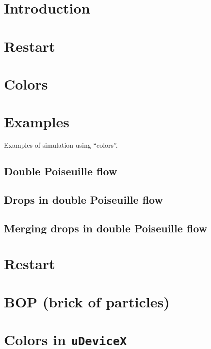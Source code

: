 \documentclass{article}
\begin{document}
\maketitle

\section{Introduction}


\section{Restart}


\section{Colors}


\section{Examples}
Examples of simulation using ``colors''.

\subsection{Double Poiseuille flow}


\subsection{Drops in double Poiseuille flow}


\subsection{Merging drops in double Poiseuille flow}


\appendix
\section{Restart}\label{a:restart}


\section{BOP (brick of particles)}\label{a:bop}


\section{Colors in \texttt{uDeviceX}}\label{a:color}

\end{document}

